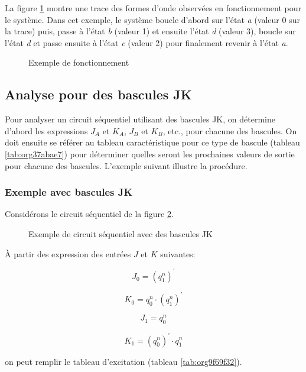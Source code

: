 \documentclass[11pt]{article}
\begin{document}
\begin{enumerate}
La figure \ref{fig:orga315be4} montre une trace des formes d'onde
observées en fonctionnement pour le système. Dans cet exemple, le
système boucle d'abord sur l'état \emph{a} (valeur 0 sur la trace) puis,
passe à l'état \emph{b} (valeur 1) et ensuite l'état \emph{d} (valeur 3),
boucle sur l'état \emph{d} et passe ensuite à l'état \emph{c} (valeur 2) pour
finalement revenir à l'état \emph{a}.

\begin{figure}[htbp]
\centering

\caption{\label{fig:orga315be4}Exemple de fonctionnement}
\end{figure}
\end{enumerate}

\subsection{Analyse pour des bascules JK}
\label{sec:org8c5cf89}

Pour analyser un circuit séquentiel utilisant des bascules JK, on
détermine d'abord les expressions \(J_A\) et \(K_A\), \(J_B\) et
\(K_B\), etc., pour chacune des bascules. On doit ensuite se référer
au tableau caractéristique pour ce type de bascule (tableau
\ref{tab:org37abae7}) pour déterminer quelles seront les prochaines valeurs
de sortie pour chacune des bascules. L'exemple suivant illustre la
procédure.

\subsubsection{Exemple avec bascules JK}
\label{sec:orgd6b8762}
Considérons le circuit séquentiel de la figure \ref{fig:orgf40207b}.

\begin{figure}[htbp]
\centering

\caption{\label{fig:orgf40207b}Exemple de circuit séquentiel avec des bascules JK}
\end{figure}

À partir des expression des entrées \(J\) et \(K\) suivantes:

$$ J_0 = (q_1^{n})^\prime $$

$$ K_0 = q_0^{n} \cdot (q_1^{n})^\prime $$

$$ J_1 = q_0^{n} $$

$$ K_1 = (q_0^{n})^\prime \cdot q_1^{n} $$

on peut remplir le tableau d'excitation (tableau \ref{tab:org9f69f32}).
\end{document}
